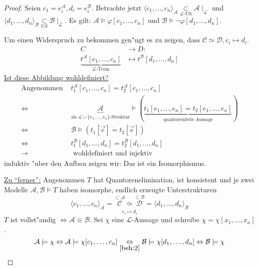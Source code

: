 \documentclass[a4paper,12pt,numbers=noenddot,parskip=full]{scrartcl}
\newcommand{\scrL}{\mathcal{L}}
\newcommand{\scrA}{\mathcal{A}}
\newcommand{\scrB}{\mathcal{B}}
\newcommand{\scrC}{\mathcal{C}}
\newcommand{\scrD}{\mathcal{D}}
\theoremstyle{dotless}
\begin{document}
\begin{proof}
	Seien $c_1=e^\scrA_i, d_i=e^\scrB_i$. Betrachte jetzt $\langle c_1, \dots, c_n \rangle_\scrA \underset{\scrL \text{-US}}{\subset} \scrA \mid_\scrL$ und $\langle d_1, \dots, d_n \rangle_\scrB \underset{US}{\subset} \scrB \mid_\scrL$. Es gilt: $\scrA \models \varphi[c_1, \dots, c_n]$ und $\scrB \models \lnot \varphi[d_1, \dots, d_n]$.
	
	Um einen Widerspruch zu bekommen gen"ugt es zu zeigen, dass $\scrC \simeq \scrD, c_i \mapsto d_i$.
	\begin{align*}
		C &\longrightarrow D:\\
		\underbrace{t^\scrA[c_1, \dots, c_n]}_{\scrL \text{-Term}} &\mapsto t^\scrB[d_1, \dots, d_n]
	\end{align*}
	\underline{Ist diese Abbildung wohldefiniert?}
	\begin{align*}
		\text{Angenommen } &t_1^\scrA[c_1, \dots, c_n] = t_2^\scrA[c_1, \dots, c_n]\\
		\Leftrightarrow &\underbrace{\scrA}_{\text{als } \scrL \cup \{e_1, \dots, e_n \} \text{-Struktur}} \models (\underbrace{t_1[e_1, \dots, e_n] \dot= t_2[e_1, \dots, e_n]}_{\text{quantorenfreie Aussage}})\\
		\Leftrightarrow &\scrB \models (t_1[\vec{e}] \dot= t_2[\vec{e}])\\
		\Leftrightarrow &t_1^\scrB[d_1, \dots, d_n] = t_2^\scrB[d_1, \dots, d_n]\\
		\longrightarrow &\text{ wohldefiniert und injektiv}
	\end{align*}
	induktiv "uber den Aufbau zeigen wir: Das ist ein Isomorphismus.
	
	\underline{Zu "`ferner"':} Angenommen $T$ hat Quantorenelimination, ist konsistent und je zwei Modelle $\scrA, \scrB \models T$ haben isomorphe, endlich erzeugte Unterstrukturen
	\begin{equation*}
		\underset{c_i \mapsto d_i}{\langle c_1, \dots, c_n \rangle_\scrA = \overset{\subset \scrA}{\scrC} \simeq \overset{\subset \scrB}{\scrD} = \langle d_1, \dots, d_n \rangle_\scrB}
	\end{equation*}
	$T$ ist vollst"andig $\Leftrightarrow \scrA \equiv \scrB$.
	Sei $\chi$ eine $\scrL$-Aussage und schreibe $\chi = \chi[x_1, \dots, x_n]$.
	\begin{equation*}
		\scrA \models \chi \Leftrightarrow \scrA \models \chi[c_1, \dots, c_n] \underset{\ref{beh:2}}{\Leftrightarrow} \scrB \models \chi[d_1, \dots, d_n] \Leftrightarrow \scrB \models \chi
	\end{equation*}
\end{proof}
\end{document}
